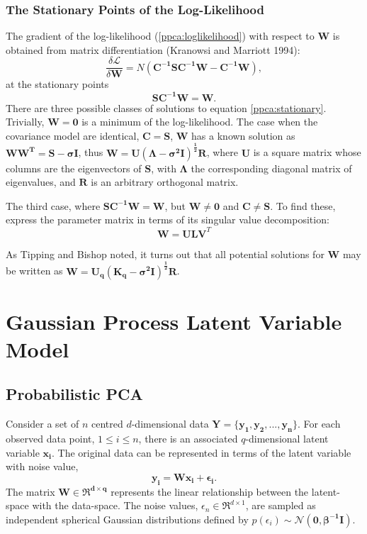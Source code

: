 \documentclass[ %
                    author={Dillon Keith Diep},
                supervisor={Dr. Carl Henrik Ek},
                    degree={MEng},
                     title={Assisted Content Generation for 3D Hair Geometry},
                  subtitle={[INCOMPLETE DRAFT, CONTAINS NOTES FROM RESEARCH]},
                      type={Research},
                      year={2014} ]{dissertation}
\begin{document}
\subsubsection{The Stationary Points of the Log-Likelihood}
The gradient of the log-likelihood (\ref{ppca:loglikelihood}) with respect to $\mathbf{W}$ is obtained from matrix differentiation (Kranowsi and Marriott 1994):
$$\frac{\delta\mathcal{L}}{\delta\mathbf{W}}=N(\mathbf{C^{-1}SC^{-1}W-C^{-1}W}),$$
at the stationary points
\begin{equation} \label{ppca:stationary}
	\mathbf{SC^{-1}W=W}.
\end{equation}
There are three possible classes of solutions to equation \ref{ppca:stationary}. Trivially, $\mathbf{W=0}$ is a minimum of the log-likelihood. The case when the covariance model are identical, $\mathbf{C=S}$, $\mathbf{W}$ has a known solution as $\mathbf{WW^T=S-\sigma I}$, thus $\mathbf{W=U(\Lambda-\sigma^2 I)^\frac{1}{2}R}$, where $\mathbf{U}$ is a square matrix whose columns are the eigenvectors of $\mathbf{S}$, with $\mathbf{\Lambda}$ the corresponding diagonal matrix of eigenvalues, and $\mathbf{R}$ is an arbitrary orthogonal matrix.

The third case, where $\mathbf{SC^{-1}W=W}$, but $\mathbf{W \ne 0}$  and $\mathbf{C \ne S}$. To find these, express the parameter matrix in terms of its singular value decomposition:
\begin{equation} \label{ppca:svd1}
	\mathbf{W=ULV}^T
\end{equation}

As Tipping and Bishop noted, it turns out that all potential solutions for $\mathbf{W}$ may be written as $\mathbf{W=U_q(K_q-\sigma^2I)^\frac{1}{2}R}$.


\section{Gaussian Process Latent Variable Model}

\subsection{Probabilistic PCA}
Consider a set of $n$ centred $d$-dimensional data $\mathbf{Y=\{y_1,y_2,...,y_n\}}$.
For each observed data point, $1 \leq i \leq n $, there is an associated $q$-dimensional latent variable $\mathbf{x_i}$.
The original data can be represented in terms of the latent variable with noise value,
$$\mathbf{y_i=Wx_i+\epsilon_i}.$$
The matrix $\mathbf{W \in \Re^{d \times q}}$ represents the linear relationship between the latent-space with the  data-space. The noise values, $\epsilon_n \in \Re^{d \times 1}$, are sampled as independent spherical Gaussian distributions defined by $p(\epsilon_i)\sim\mathcal{N}(\mathbf{0, \beta^{-1}I})$.
\end{document}

